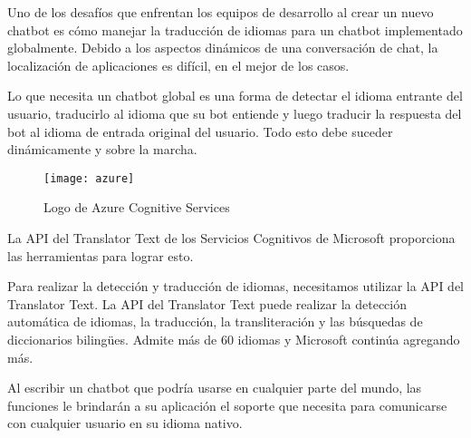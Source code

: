 Uno de los desafíos que enfrentan los equipos de desarrollo al crear un nuevo chatbot es cómo manejar la traducción de idiomas para un chatbot implementado globalmente. Debido a los aspectos dinámicos de una conversación de chat, la localización de aplicaciones es difícil, en el mejor de los casos.

Lo que necesita un chatbot global es una forma de detectar el idioma entrante del usuario, traducirlo al idioma que su bot entiende y luego traducir la respuesta del bot al idioma de entrada original del usuario. Todo esto debe suceder dinámicamente y sobre la marcha.

\begin{figure}[htp!]
  \centering
  \texttt{[image: azure]}
  \caption{Logo de Azure Cognitive Services}
  \label{fig:azure}
\end{figure}

La API del Translator Text de los Servicios Cognitivos de Microsoft proporciona las herramientas para lograr esto.

Para realizar la detección y traducción de idiomas, necesitamos utilizar la API del Translator Text. La API del Translator Text puede realizar la detección automática de idiomas, la traducción, la transliteración y las búsquedas de diccionarios bilingües. Admite más de 60 idiomas y Microsoft continúa agregando más.

Al escribir un chatbot que podría usarse en cualquier parte del mundo, las funciones le brindarán a su aplicación el soporte que necesita para comunicarse con cualquier usuario en su idioma nativo.
